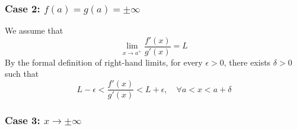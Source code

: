 \documentclass[11pt]{article}
\begin{document}
\subsubsection*{Case 2: $f(a)=g(a)=\pm\infty$}
We assume that 
\[
  \lim_{x\to a^+}\frac{f'(x)}{g'(x)}=L
\]
By the formal definition of right-hand limits, for every $\epsilon > 0$, there exists $\delta >0$ such that 
\[
  L-\epsilon < \frac{f'(x)}{g'(x)} < L +\epsilon ,\quad\forall a<x<a+\delta
\]
\subsubsection*{Case 3: $x\to\pm\infty$}
\section*{}
\end{document}
